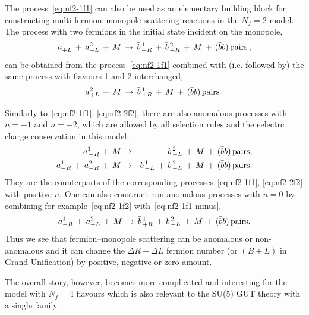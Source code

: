 \documentclass[a4paper,11pt]{article}
\begin{document}
 \medskip
 
 The process~\eqref{eq:nf2-1f1} can also be used as an elementary building block for constructing multi-fermion--monopole scattering reactions in the $N_f=2$ model. The process with two fermions in the initial state incident on the monopole, 
\begin{equation}
\label{eq:nf2-2f2}
 a_{+L}^1 \,+\,a_{+L}^2 \,+\,  M \,\to\, \bar{b}_{\,+R}^{\,1} \,+\, \bar{b}_{\,+R}^{\,2} \,+\,  M \,+\, (\bar{b}b)\,{\rm pairs} \,,
\end{equation} 
can be obtained from the process~\eqref{eq:nf2-1f1} combined with (i.e. followed by) the same process with flavours 1 and 2 interchanged,
\begin{equation}
\label{eq:nf2-1f2}
 a_{+L}^2 \,+\, M \,\to\, \bar{b}_{\,+R}^{\,1} \,+\, M \,+\, (\bar{b}b)\,{\rm pairs} \,.
\end{equation}

\medskip

Similarly to~\eqref{eq:nf2-1f1}, \eqref{eq:nf2-2f2}, there are also anomalous processes with $n=-1$ and $n=-2$, 
which are allowed by all selection rules and the eelectrc charge conservation in this model,
\begin{eqnarray}
\label{eq:nf2-1f1-minus}
 \bar{a}_{\,-R}^1 \,+\, M &\to& b_{\,-L}^{\,2} \,+\, M \,+\, (\bar{b}b)\,{\rm pairs},\\
 \label{eq:nf2-2f2-minus}
 \bar{a}_{-R}^1 \,+\, \bar{a}_{-R}^2 \,+\,  M &\to& b_{\,-L}^{\,1} \,+\, b_{\,-L}^{\,2} \,+\,  M \,+\, (\bar{b}b)\,{\rm pairs}.
\end{eqnarray}
They are the counterparts of the corresponding processes~\eqref{eq:nf2-1f1}, \eqref{eq:nf2-2f2} with positive $n$.
One can also construct non-anomalous processes with $n=0$ by combining for example~\eqref{eq:nf2-1f2} with~\eqref{eq:nf2-1f1-minus},
\begin{equation}
\label{eq:n=0Nf2}
\bar{a}_{-R}^1 \,+\,  a_{+L}^2 \,+\, M \,\to\, \bar{b}_{\,+R}^{\,1} \,+\, b_{\,-L}^{\,2} \,+\, M \,+\, (\bar{b}b)\,{\rm pairs}.
\end{equation}
Thus we see that fermion--monopole scattering can be anomalous or non-anomalous and it can change the  $\Delta R-\Delta L$ fermion number (or $(B+L)$ in Grand Unification) by positive, negative or zero amount.
\medskip

The overall story, however,  becomes more complicated and interesting for the model with $N_f=4$ flavours which is also relevant to the SU(5) GUT theory with a single family.
\end{document}
